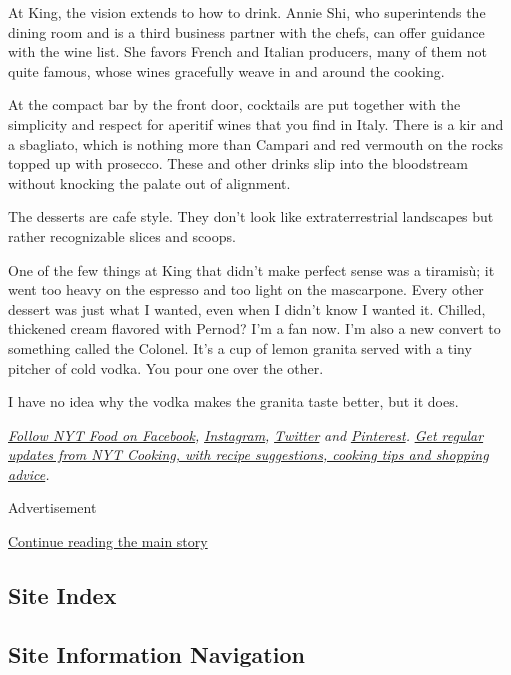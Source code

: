 At King, the vision extends to how to drink. Annie Shi, who superintends
the dining room and is a third business partner with the chefs, can
offer guidance with the wine list. She favors French and Italian
producers, many of them not quite famous, whose wines gracefully weave
in and around the cooking.

At the compact bar by the front door, cocktails are put together with
the simplicity and respect for aperitif wines that you find in Italy.
There is a kir and a sbagliato, which is nothing more than Campari and
red vermouth on the rocks topped up with prosecco. These and other
drinks slip into the bloodstream without knocking the palate out of
alignment.

The desserts are cafe style. They don't look like extraterrestrial
landscapes but rather recognizable slices and scoops.

One of the few things at King that didn't make perfect sense was a
tiramisù; it went too heavy on the espresso and too light on the
mascarpone. Every other dessert was just what I wanted, even when I
didn't know I wanted it. Chilled, thickened cream flavored with Pernod?
I'm a fan now. I'm also a new convert to something called the Colonel.
It's a cup of lemon granita served with a tiny pitcher of cold vodka.
You pour one over the other.

I have no idea why the vodka makes the granita taste better, but it
does.

\href{https://www.facebookcorewwwi.onion/nytfood/}{\emph{Follow NYT Food
on Facebook}}\emph{,}
\href{https://instagram.com/nytfood}{\emph{Instagram}}\emph{,}
\href{https://twitter.com/nytfood}{\emph{Twitter}} \emph{and}
\href{https://www.pinterest.com/nytfood/}{\emph{Pinterest}}\emph{.}
\href{https://www.nytimes3xbfgragh.onion/newsletters/cooking}{\emph{Get
regular updates from NYT Cooking, with recipe suggestions, cooking tips
and shopping advice}}\emph{.}

Advertisement

\protect\hyperlink{after-bottom}{Continue reading the main story}

\hypertarget{site-index}{%
\subsection{Site Index}\label{site-index}}

\hypertarget{site-information-navigation}{%
\subsection{Site Information
Navigation}\label{site-information-navigation}}


